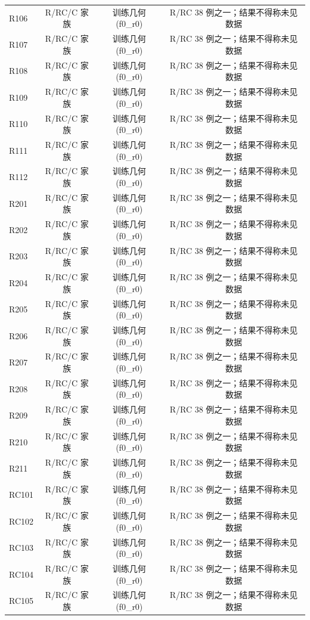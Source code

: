 \begin{table}[htbp]
\begin{tabular}{lccc}
R106 & R/RC/C 家族 & 训练几何(f0_r0) & R/RC 38 例之一；结果不得称未见数据 \\
R107 & R/RC/C 家族 & 训练几何(f0_r0) & R/RC 38 例之一；结果不得称未见数据 \\
R108 & R/RC/C 家族 & 训练几何(f0_r0) & R/RC 38 例之一；结果不得称未见数据 \\
R109 & R/RC/C 家族 & 训练几何(f0_r0) & R/RC 38 例之一；结果不得称未见数据 \\
R110 & R/RC/C 家族 & 训练几何(f0_r0) & R/RC 38 例之一；结果不得称未见数据 \\
R111 & R/RC/C 家族 & 训练几何(f0_r0) & R/RC 38 例之一；结果不得称未见数据 \\
R112 & R/RC/C 家族 & 训练几何(f0_r0) & R/RC 38 例之一；结果不得称未见数据 \\
R201 & R/RC/C 家族 & 训练几何(f0_r0) & R/RC 38 例之一；结果不得称未见数据 \\
R202 & R/RC/C 家族 & 训练几何(f0_r0) & R/RC 38 例之一；结果不得称未见数据 \\
R203 & R/RC/C 家族 & 训练几何(f0_r0) & R/RC 38 例之一；结果不得称未见数据 \\
R204 & R/RC/C 家族 & 训练几何(f0_r0) & R/RC 38 例之一；结果不得称未见数据 \\
R205 & R/RC/C 家族 & 训练几何(f0_r0) & R/RC 38 例之一；结果不得称未见数据 \\
R206 & R/RC/C 家族 & 训练几何(f0_r0) & R/RC 38 例之一；结果不得称未见数据 \\
R207 & R/RC/C 家族 & 训练几何(f0_r0) & R/RC 38 例之一；结果不得称未见数据 \\
R208 & R/RC/C 家族 & 训练几何(f0_r0) & R/RC 38 例之一；结果不得称未见数据 \\
R209 & R/RC/C 家族 & 训练几何(f0_r0) & R/RC 38 例之一；结果不得称未见数据 \\
R210 & R/RC/C 家族 & 训练几何(f0_r0) & R/RC 38 例之一；结果不得称未见数据 \\
R211 & R/RC/C 家族 & 训练几何(f0_r0) & R/RC 38 例之一；结果不得称未见数据 \\
RC101 & R/RC/C 家族 & 训练几何(f0_r0) & R/RC 38 例之一；结果不得称未见数据 \\
RC102 & R/RC/C 家族 & 训练几何(f0_r0) & R/RC 38 例之一；结果不得称未见数据 \\
RC103 & R/RC/C 家族 & 训练几何(f0_r0) & R/RC 38 例之一；结果不得称未见数据 \\
RC104 & R/RC/C 家族 & 训练几何(f0_r0) & R/RC 38 例之一；结果不得称未见数据 \\
RC105 & R/RC/C 家族 & 训练几何(f0_r0) & R/RC 38 例之一；结果不得称未见数据 \\

\end{tabular}
\end{table}
